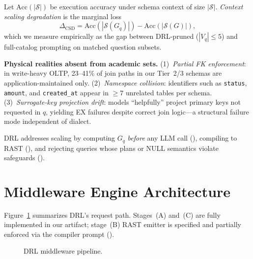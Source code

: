 \documentclass[twocolumn]{svjour3}
\begin{document}
\begin{drdef}
\label{def:csd}
Let $\text{Acc}(|\mathcal{S}|)$ be execution accuracy under schema context of size $|\mathcal{S}|$.
\emph{Context scaling degradation} is the marginal loss
\begin{equation}
  \Delta_{\text{CSD}} = \text{Acc}(|\mathcal{S}(G_q)|) - \text{Acc}(|\mathcal{S}(G)|),
\end{equation}
which we measure empirically as the gap between DRL-pruned ($|V_q|\le 5$) and full-catalog prompting on matched question subsets.
\end{drdef}

\textbf{Physical realities absent from academic sets.}
(1)~\emph{Partial FK enforcement}: in write-heavy OLTP, 23--41\% of join paths in our Tier~2/3 schemas are application-maintained only.
(2)~\emph{Namespace collision}: identifiers such as \texttt{status}, \texttt{amount}, and \texttt{created\_at} appear in $\ge 7$ unrelated tables per schema.
(3)~\emph{Surrogate-key projection drift}: models ``helpfully'' project primary keys not requested in $q$, yielding EX failures despite correct join logic---a structural failure mode independent of dialect.

DRL addresses scaling by computing $G_q$ \emph{before} any LLM call (), compiling to RAST (), and rejecting queries whose plans or NULL semantics violate safeguards ().

\section{Middleware Engine Architecture}
\label{sec:arch}

Figure~\ref{fig:pipeline} summarizes DRL's request path.
Stages~(A) and~(C) are fully implemented in our artifact; stage~(B) RAST emitter is specified and partially enforced via the compiler prompt ().

\begin{figure}[t]
\centering
{}
\caption{DRL middleware pipeline.}
\label{fig:pipeline}
\end{figure}
\end{document}
